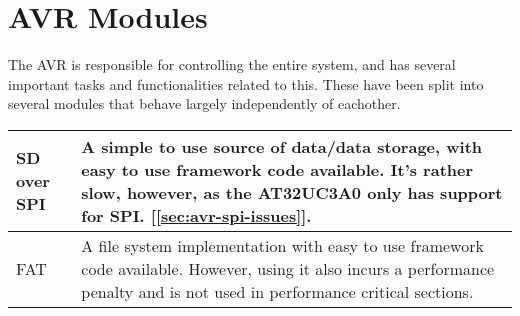 \section{AVR Modules}


The AVR is responsible for controlling the entire system, and has several
important tasks and functionalities related to this. These have been split
into several modules that behave largely independently of eachother.

\begin{table}[htbp]
  \centering
  \begin{tabular}{l|p{10cm}}


  \ac{SD} over \ac{SPI} & A simple to use source of data/data storage, with easy
  to use framework code available. It's rather slow, however, as the AT32UC3A0
  only has support for \ac{SPI}. [\ref{sec:avr-spi-issues}]. \\ \hline


  \ac{FAT} & A file system implementation with easy to use framework code
  available. However, using it also incurs a performance penalty and is not used
  in performance critical sections. \\ \hline



\end{tabular}
\end{table}
